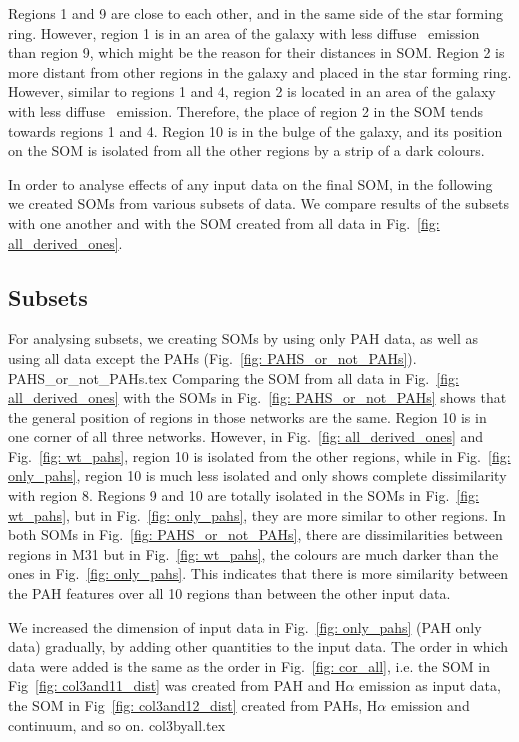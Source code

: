     Regions 1 and 9 are close to each other, and in the same side of the star forming ring. 
    However, region 1 is in an area of the galaxy with less diffuse \halpha~emission than region 9, which might be the reason for their distances in SOM.
    Region 2 is more distant from other regions in the galaxy and placed in the star forming ring.
    However, similar to regions 1 and 4, region 2 is located in an area of the galaxy with less diffuse \halpha~emission.
    Therefore, the place of region 2 in the SOM tends towards regions 1 and 4. 
    Region 10 is in the bulge of the galaxy, and its position on the SOM is isolated from all the other regions by a strip of a dark colours. 
    
    In order to analyse effects of any input data on the final SOM, in the following we created SOMs from various subsets of data.
    We compare results of the subsets with one another and with the SOM created from all data in Fig.~\ref{fig: all_derived_ones}.

    \subsection{Subsets}
    \label{sec: subsets}
            For analysing subsets, we creating SOMs by using only PAH data, as well as using all data except the PAHs (Fig.~\ref{fig: PAHS_or_not_PAHs}).
             {PAHS_or_not_PAHs.tex}
            Comparing the SOM from all data in Fig.~\ref{fig: all_derived_ones} with the SOMs in Fig.~\ref{fig: PAHS_or_not_PAHs} shows that the general position of regions in those networks are the same. 
            Region 10 is in one corner of all three networks.
            However, in Fig.~\ref{fig: all_derived_ones} and Fig.~\ref{fig: wt_pahs}, region 10 is isolated from the other regions, while in Fig.~\ref{fig: only_pahs}, region 10 is much less isolated and only shows complete dissimilarity with region 8.
            Regions 9 and 10 are totally isolated in the SOMs in Fig.~\ref{fig: wt_pahs}, but in Fig.~\ref{fig: only_pahs}, they are more similar to other regions.
            In both SOMs in Fig.~\ref{fig: PAHS_or_not_PAHs}, there are dissimilarities between regions in M31 but in Fig.~\ref{fig: wt_pahs}, the colours are much darker than the ones in Fig.~\ref{fig: only_pahs}.
            This indicates that there is more similarity between the PAH features over all 10 regions than between the other input data.
            
            We increased the dimension of input data in Fig.~\ref{fig: only_pahs} (PAH only data) gradually, by adding other quantities to the input data. 
            The order in which data were added is the same as the order in Fig.~\ref{fig: cor_all}, i.e. the SOM in Fig~\ref{fig: col3and11_dist} was created from PAH and H$\alpha$ emission as input data, the SOM in Fig~\ref{fig: col3and12_dist} created from PAHs, H$\alpha$ emission and \sii~ continuum, and so on. 
            {col3byall.tex}
            
